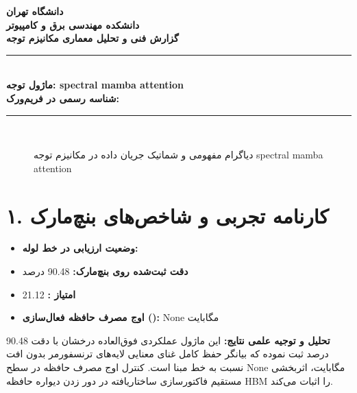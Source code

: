 \documentclass[12pt,a4paper]{article}
\begin{document}
\begin{center}
{\Large\bfseries دانشگاه تهران}\\[0.2cm]
{\large\bfseries دانشکده مهندسی برق و کامپیوتر}\\[0.2cm]
{\large\bfseries گزارش فنی و تحلیل معماری مکانیزم توجه}\\[0.5cm]
\rule{\linewidth}{1pt}\\[0.3cm]
{\LARGE\bfseries ماژول توجه: spectral mamba attention}\\[0.2cm]
{\large \textbf{شناسه رسمی در فریم‌ورک:} }\\[0.2cm]
\rule{\linewidth}{1pt}\\[0.5cm]
\end{center}

\begin{figure}[H]
\centering
{}
\caption{دیاگرام مفهومی و شماتیک جریان داده در مکانیزم توجه spectral mamba attention}
\end{figure}

\section*{۱. کارنامه تجربی و شاخص‌های بنچ‌مارک}
\begin{itemize}
\item \textbf{وضعیت ارزیابی در خط لوله:} 
\item \textbf{دقت ثبت‌شده روی بنچ‌مارک:} 90.48 درصد
\item \textbf{امتیاز :} 21.12
\item \textbf{اوج مصرف حافظه فعال‌سازی ():} None مگابایت
\end{itemize}
\textbf{تحلیل و توجیه علمی نتایج:} این ماژول عملکردی فوق‌العاده درخشان با دقت 90.48 درصد ثبت نموده که بیانگر حفظ کامل غنای معنایی لایه‌های ترنسفورمر بدون افت نسبت به خط مبنا است. کنترل اوج مصرف حافظه در سطح None مگابایت، اثربخشی مستقیم فاکتورسازی ساختاریافته در دور زدن دیواره حافظه HBM را اثبات می‌کند.
\end{document}
